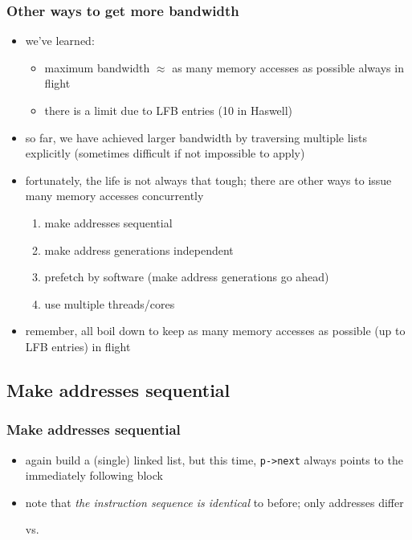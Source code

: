 \documentclass[12pt,dvipdfmx]{beamer}
\newcommand{\aka}[1]{{\color{red}#1}}
\begin{document}
\begin{frame}[fragile]
\frametitle{Other ways to get more bandwidth}
\begin{itemize}
\item<1-> we've learned:
  \begin{itemize}
  \item maximum bandwidth $\approx$ 
    as many memory accesses as possible always in flight
  \item there is a limit due to LFB entries (10 in Haswell) 
  \end{itemize}

\item<2-> so far, we have achieved larger bandwidth by traversing
  multiple lists explicitly (sometimes difficult if not impossible to apply)

\item<3-> fortunately, the life is not always that
  tough; there are other ways to issue many memory accesses concurrently
  \begin{enumerate}
  \item make addresses sequential
  \item make address generations independent
  \item prefetch by software (make address generations go ahead)
  \item use multiple threads/cores
  \end{enumerate}
  
\item<4-> remember, all boil down to keep as many 
  memory accesses as possible (up to LFB entries) in flight 
\end{itemize}
\end{frame}

\subsection{Make addresses sequential}

\begin{frame}[fragile]
\frametitle{Make addresses sequential}
\begin{itemize}
\item again build a (single) linked list, but this time, {\tt p->next}
  always points to the immediately following block 

\item note that \aka{\em the instruction sequence
    is identical} to before; only addresses differ

\begin{center}
\def\svgwidth{0.5\textwidth}
{\footnotesize }
\end{center}
\begin{center}
  vs.
\end{center}
\begin{center}
\def\svgwidth{0.5\textwidth}
{\scriptsize }
\end{center}
\end{itemize}
\end{frame}
\end{document}
